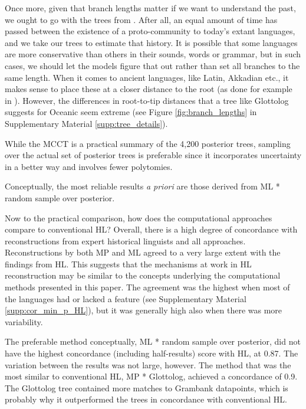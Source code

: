 \documentclass[12pt,letterpaper]{article}
\begin{document}
Once more, given that branch lengths matter if we want to understand the past, we ought to go with the trees from \cite{grayetal_2009}. After all, an equal amount of time has passed between the existence of a proto-community to today's extant languages, and we take our trees to estimate that history. It is possible that some languages are more conservative than others in their sounds, words or grammar, but in such cases, we should let the models figure that out rather than set all branches to the same length. When it comes to ancient languages, like Latin, Akkadian etc., it makes sense to place these at a closer distance to the root (as done for example in \citealt{carling2021reconstructing}). However, the differences in root-to-tip distances that a tree like Glottolog suggests for Oceanic seem extreme (see Figure \ref{fig:branch_lengths} in Supplementary Material \ref{supp:tree_details}). 

While the MCCT is a practical summary of the 4,200 posterior trees, sampling over the actual set of posterior trees is preferable since it incorporates uncertainty in a better way and involves fewer polytomies.

Conceptually, the most reliable results \textit{a priori} are those derived from ML * random sample over posterior.

Now to the practical comparison, how does the computational approaches compare to conventional HL? Overall, there is a high degree of concordance with reconstructions from expert historical linguists and all approaches. Reconstructions by both MP and ML agreed to a very large extent with the findings from HL. This suggests that the mechanisms at work in HL reconstruction may be similar to the concepts underlying the computational methods presented in this paper. The agreement was the highest when most of the languages had or lacked a feature (see Supplementary Material \ref{supp:cor_min_p_HL}), but it was generally high also when there was more variability.

The preferable method conceptually, ML * random sample over \citet{grayetal_2009} posterior, did not have the highest concordance (including half-results) score with HL, at 0.87. The variation between the results was not large, however. The method that was the most similar to conventional HL, MP * Glottolog, achieved a concordance of 0.9. The Glottolog tree contained more matches to Grambank datapoints, which is probably why it outperformed the \cite{grayetal_2009} trees in concordance with conventional HL.
\end{document}
